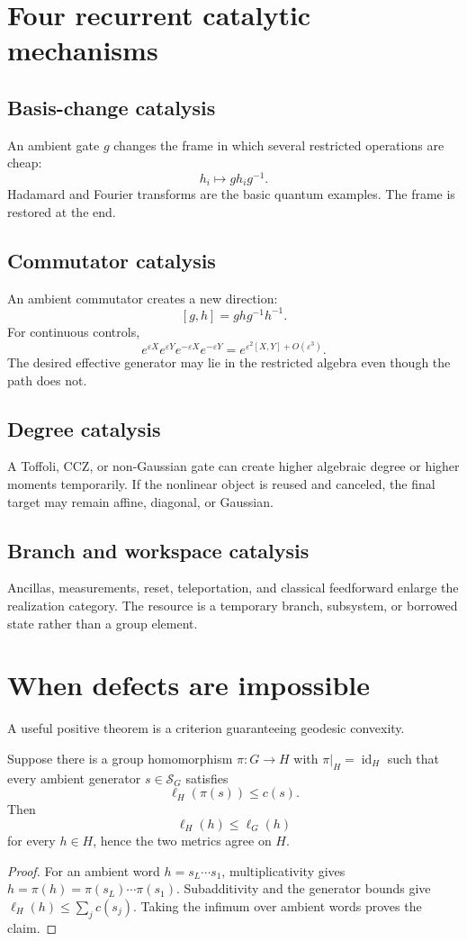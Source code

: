 \section{Four recurrent catalytic mechanisms}
\subsection{Basis-change catalysis}
An ambient gate $g$ changes the frame in which several restricted operations are cheap:
\[
h_i\mapsto gh_ig^{-1}.
\]
Hadamard and Fourier transforms are the basic quantum examples.  The frame is restored at the end.

\subsection{Commutator catalysis}
An ambient commutator creates a new direction:
\[
[g,h]=ghg^{-1}h^{-1}.
\]
For continuous controls,
\[
e^{\varepsilon X}e^{\varepsilon Y}e^{-\varepsilon X}e^{-\varepsilon Y}
=
e^{\varepsilon^2[X,Y]+O(\varepsilon^3)}.
\]
The desired effective generator may lie in the restricted algebra even though the path does not.

\subsection{Degree catalysis}
A Toffoli, CCZ, or non-Gaussian gate can create higher algebraic degree or higher moments temporarily.  If the nonlinear object is reused and canceled, the final target may remain affine, diagonal, or Gaussian.

\subsection{Branch and workspace catalysis}
Ancillas, measurements, reset, teleportation, and classical feedforward enlarge the realization category.  The resource is a temporary branch, subsystem, or borrowed state rather than a group element.

\section{When defects are impossible}
A useful positive theorem is a criterion guaranteeing geodesic convexity.
\begin{proposition}
Suppose there is a group homomorphism $\pi:G\to H$ with $\pi|_H=\operatorname{id}_H$ such that every ambient generator $s\in\mathcal S_G$ satisfies
\[
\ell_H(\pi(s))\le c(s).
\]
Then
\[
\ell_H(h)\le\ell_G(h)
\]
for every $h\in H$, hence the two metrics agree on $H$.
\end{proposition}
\begin{proof}
For an ambient word $h=s_L\cdots s_1$, multiplicativity gives $h=\pi(h)=\pi(s_L)\cdots\pi(s_1)$.  Subadditivity and the generator bounds give $\ell_H(h)\le\sum_j c(s_j)$.  Taking the infimum over ambient words proves the claim.
\end{proof}

